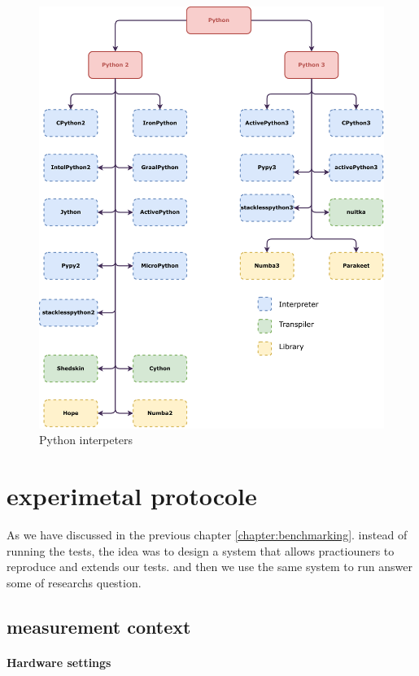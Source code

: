 \begin{figure}
    \centering
    \includegraphics[width=\linewidth]{imgs/python-implementations-tree}
    \caption{Python interpeters}
    \label{fig:interpreters}
\end{figure}



\section{experimetal protocole}

As we have discussed in the previous chapter \ref{chapter:benchmarking}. instead of running the tests, the idea was to design a system that allows practiouners to reproduce and extends our tests. and then we use the same system to run answer some of researchs question.
\subsection{measurement context}
\paragraph{Hardware settings}


